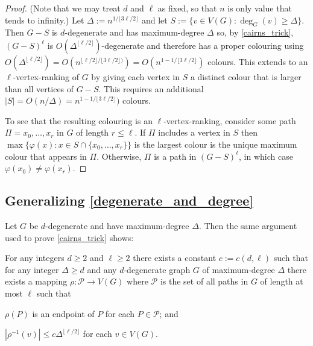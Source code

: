 \documentclass{patmorin}
\begin{document}
\begin{proof}
  (Note that we may treat $d$ and $\ell$ as fixed, so that $n$ is only value that tends to infinity.)
  Let $\Delta:=n^{1/\lfloor 3\ell/2\rfloor}$ and let $S:=\{v\in V(G):\deg_G(v)\ge\Delta\}$.  Then $G-S$ is $d$-degenerate and has maximum-degree $\Delta$ so, by \cref{cairns_trick}, $(G-S)^{\ell}$ is $O(\Delta^{\lfloor\ell/2\rfloor})$-degenerate and therefore has a proper colouring using $O(\Delta^{\lfloor\ell/2\rfloor})=O(n^{\lfloor\ell/2\rfloor/\lfloor 3\ell/2\rfloor)})=O(n^{1-1/\lfloor 3\ell/2\rfloor})$ colours.  This extends to an $\ell$-vertex-ranking of $G$ by giving each vertex in $S$ a distinct colour that is larger than all vertices of $G-S$.  This requires an additional $|S|=O(n/\Delta)=n^{1-1/\lfloor 3\ell/2\rfloor})$ colours.

  To see that the resulting colouring is an $\ell$-vertex-ranking, consider some path $\Pi=x_0,\ldots,x_r$ in $G$ of length $r\le\ell$.  If $\Pi$ includes a vertex in $S$ then $\max\{\varphi(x):x\in S\cap \{x_0,\ldots,x_r\}\}$ is the largest colour is the unique maximum colour that appears in $\Pi$.  Otherwise, $\Pi$ is a path in $(G-S)^{\ell}$, in which case $\varphi(x_0)\neq\varphi(x_r)$.
\end{proof}

\subsection{Generalizing \cref{degenerate_and_degree}}

Let $G$ be $d$-degenerate and have maximum-degree $\Delta$.  Then the same argument used to prove \cref{cairns_trick} shows:

\begin{lem}\label{advanced_cairns}
  For any integers $d\ge 2$ and $\ell\ge 2$ there exists a constant $c:=c(d,\ell)$ such that for any integer $\Delta\ge d$ and any
  $d$-degenerate graph $G$ of maximum-degree $\Delta$ there exists a mapping $\rho:\mathcal{P}\to V(G)$ where $\mathcal{P}$ is the set of all paths in $G$ of length at most $\ell$ such that
  \begin{compactenum}[(i)]
    \item $\rho(P)$ is an endpoint of $P$ for each $P\in\mathcal{P}$; and
    \item $|\rho^{-1}(v)| \le c\Delta^{\lfloor\ell/2\rfloor}$ for each $v\in V(G)$.
  \end{compactenum}
\end{lem}
\end{document}
